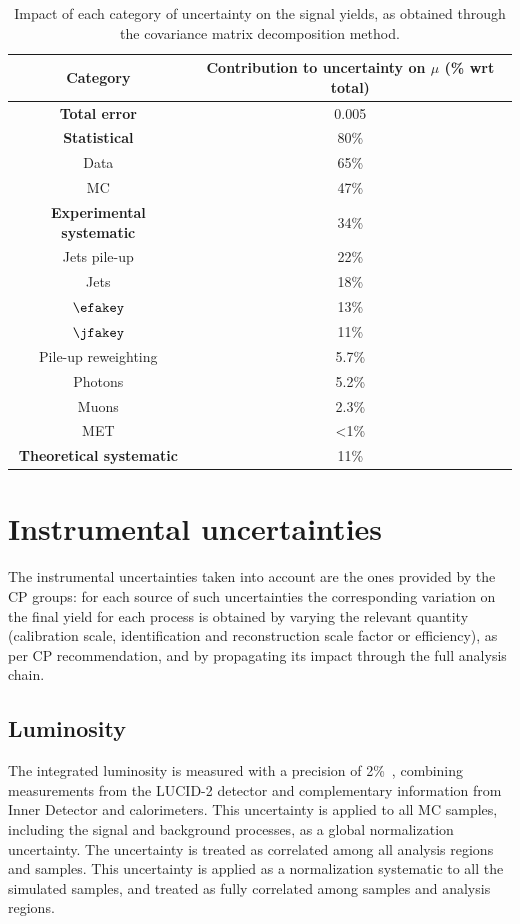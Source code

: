 \begin{table}[!htbp]
  \small
  \center
    \begin{tabular}{ c | c  }
      \hline
      \textbf{Category}         &      \textbf{Contribution to uncertainty on $\mu$ (\% wrt total)}\\ \hline
      \textbf{Total error} & 0.005 \\ \hline
      \textbf{Statistical} & 80\% \\ 
      Data & 65\%\\
      MC & 47\%\\\hline
      \textbf{Experimental systematic} & 34\%\\
      Jets pile-up & 22\%\\
      Jets & 18\%\\
      $\efakey$ & 13\%\\
      $\jfakey$ & 11\%\\
      Pile-up reweighting & 5.7\%\\
      Photons &  5.2\% \\
      Muons &  2.3\% \\
      MET & <1\% \\\hline
      \textbf{Theoretical systematic} & 11\% \\
      \hline
    \end{tabular}
  \caption{Impact of each category of uncertainty on the signal yields, as obtained through the covariance matrix decomposition method.}
  \label{tab:impacts}
\end{table}


\section{Instrumental uncertainties}
\label{sec:expsysts}

The instrumental uncertainties taken into account are the ones provided by the CP groups: for each source of such uncertainties the corresponding variation on the final yield for each process is obtained by varying  the relevant quantity (calibration scale, identification and reconstruction scale factor or efficiency), as per CP recommendation, and by propagating its impact through the full analysis chain. \\
\subsection{Luminosity}
The integrated luminosity is measured with a precision of 2\%~\cite{lumi}, combining measurements from the LUCID-2 detector and complementary information from Inner Detector and calorimeters. This uncertainty is applied to all MC samples, including the signal and background processes, as a global normalization uncertainty. The uncertainty is treated as correlated among all analysis regions and samples.
This uncertainty is applied as a normalization systematic to all the simulated samples, and treated as fully correlated among samples and analysis regions. 


